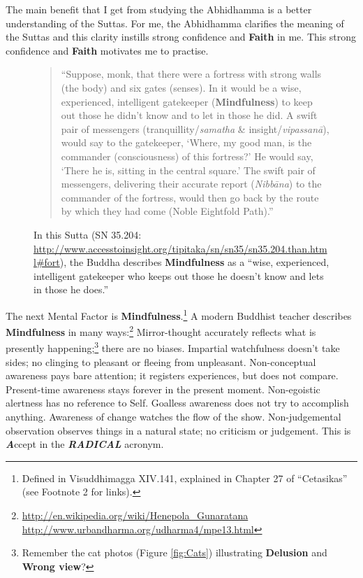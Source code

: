 The main benefit that I get from studying the Abhidhamma is a better understanding of the Suttas. For me, the Abhidhamma clarifies the meaning of the Suttas and this clarity instills strong confidence and \textbf{Faith} in me. This strong confidence and \textbf{Faith} motivates me to practise.

\begin{figure}[H]
\centering

\begin{quote}
“Suppose, monk, that there were a fortress with strong walls (the body) and six gates (senses). In it would be a wise, experienced, intelligent gatekeeper (\textbf{Mindfulness}) to keep out those he didn't know and to let in those he did. A swift pair of messengers (tranquillity/\textit{samatha} \& insight/\textit{vipassanā}), would say to the gatekeeper, ‘Where, my good man, is the commander (consciousness) of this fortress?’ He would say, ‘There he is, sitting in the central square.’ The swift pair of messengers, delivering their accurate report (\textit{Nibbāna}) to the commander of the fortress, would then go back by the route by which they had come (Noble Eightfold Path).”
\end{quote}
\caption{In this Sutta (SN 35.204: \url{http://www.accesstoinsight.org/tipitaka/sn/sn35/sn35.204.than.html\#fort}), the Buddha describes \textbf{Mindfulness} as a “wise, experienced, intelligent gatekeeper who keeps out those he doesn’t know and lets in those he does.”}
\label{fig:Fortress}
\end{figure}

\pagebreak

The next Mental Factor is \textbf{Mindfulness}.\footnote{Defined in Visuddhimagga XIV.141, explained in Chapter 27 of “Cetasikas” (see Footnote 2 for links).} A modern Buddhist teacher describes \textbf{Mindfulness} in many ways:\footnote{\url{http://en.wikipedia.org/wiki/Henepola_Gunaratana} \\ \url{http://www.urbandharma.org/udharma4/mpe13.html}} Mirror-thought accurately reflects what is presently happening;\footnote{Remember the cat photos (Figure \ref{fig:Cats}) illustrating \textbf{Delusion} and \textbf{Wrong view}?} there are no biases. Impartial watchfulness doesn’t take sides; no clinging to pleasant or fleeing from unpleasant. Non-conceptual awareness pays bare attention; it registers experiences, but does not compare. Present-time awareness stays forever in the present moment. Non-egoistic alertness has no reference to Self. Goalless awareness does not try to accomplish anything. Awareness of change watches the flow of the show. Non-judgemental observation observes things in a natural state; no criticism or judgement. This is \textbf{\textit{A}}ccept in the \textbf{\textit{RADICAL}} acronym.


